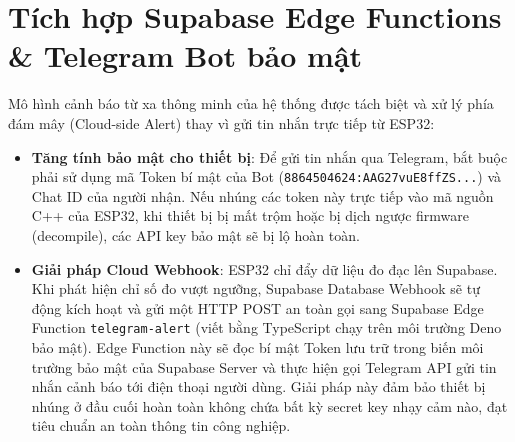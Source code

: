 \section{Tích hợp Supabase Edge Functions \& Telegram Bot bảo mật}
Mô hình cảnh báo từ xa thông minh của hệ thống được tách biệt và xử lý phía đám mây (Cloud-side Alert) thay vì gửi tin nhắn trực tiếp từ ESP32:
\begin{itemize}
    \item \textbf{Tăng tính bảo mật cho thiết bị}: Để gửi tin nhắn qua Telegram, bắt buộc phải sử dụng mã Token bí mật của Bot (\texttt{8864504624:AAG27vuE8ffZS...}) và Chat ID của người nhận. Nếu nhúng các token này trực tiếp vào mã nguồn C++ của ESP32, khi thiết bị bị mất trộm hoặc bị dịch ngược firmware (decompile), các API key bảo mật sẽ bị lộ hoàn toàn.
    \item \textbf{Giải pháp Cloud Webhook}: ESP32 chỉ đẩy dữ liệu đo đạc lên Supabase. Khi phát hiện chỉ số đo vượt ngưỡng, Supabase Database Webhook sẽ tự động kích hoạt và gửi một HTTP POST an toàn gọi sang Supabase Edge Function \texttt{telegram-alert} (viết bằng TypeScript chạy trên môi trường Deno bảo mật). Edge Function này sẽ đọc bí mật Token lưu trữ trong biến môi trường bảo mật của Supabase Server và thực hiện gọi Telegram API gửi tin nhắn cảnh báo tới điện thoại người dùng. Giải pháp này đảm bảo thiết bị nhúng ở đầu cuối hoàn toàn không chứa bất kỳ secret key nhạy cảm nào, đạt tiêu chuẩn an toàn thông tin công nghiệp.
\end{itemize}
